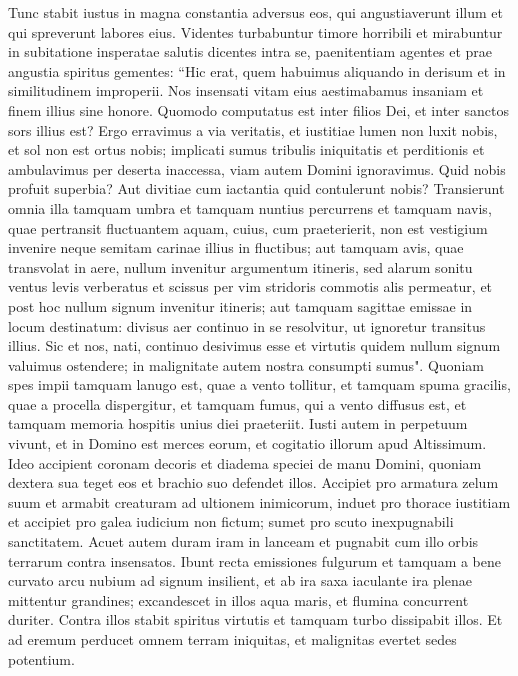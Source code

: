 \begin{biblechapter}  
\verse Tunc stabit iustus in magna constantia adversus eos, qui angustiaverunt illum et qui spreverunt labores eius. 
\verse Videntes turbabuntur timore horribili et mirabuntur in subitatione insperatae salutis 
\verse dicentes intra se, paenitentiam agentes et prae angustia spiritus gementes: 
\verse “Hic erat, quem habuimus aliquando in derisum et in similitudinem improperii. Nos insensati vitam eius aestimabamus insaniam et finem illius sine honore. 
\verse Quomodo computatus est inter filios Dei, et inter sanctos sors illius est? 
\verse Ergo erravimus a via veritatis, et iustitiae lumen non luxit nobis, et sol non est ortus nobis; 
\verse implicati sumus tribulis iniquitatis et perditionis et ambulavimus per deserta inaccessa, viam autem Domini ignoravimus. 
\verse Quid nobis profuit superbia? Aut divitiae cum iactantia quid contulerunt nobis? 
\verse Transierunt omnia illa tamquam umbra et tamquam nuntius percurrens 
\verse et tamquam navis, quae pertransit fluctuantem aquam, cuius, cum praeterierit, non est vestigium invenire neque semitam carinae illius in fluctibus; 
\verse aut tamquam avis, quae transvolat in aere, nullum invenitur argumentum itineris, sed alarum sonitu ventus levis verberatus et scissus per vim stridoris commotis alis permeatur, et post hoc nullum signum invenitur itineris; 
\verse aut tamquam sagittae emissae in locum destinatum: divisus aer continuo in se resolvitur, ut ignoretur transitus illius. 
\verse Sic et nos, nati, continuo desivimus esse et virtutis quidem nullum signum valuimus ostendere; in malignitate autem nostra consumpti sumus". 
\verse Quoniam spes impii tamquam lanugo est, quae a vento tollitur, et tamquam spuma gracilis, quae a procella dispergitur, et tamquam fumus, qui a vento diffusus est, et tamquam memoria hospitis unius diei praeteriit. 
\verse Iusti autem in perpetuum vivunt, et in Domino est merces eorum, et cogitatio illorum apud Altissimum. 
\verse Ideo accipient coronam decoris et diadema speciei de manu Domini, quoniam dextera sua teget eos et brachio suo defendet illos. 
\verse Accipiet pro armatura zelum suum et armabit creaturam ad ultionem inimicorum, 
\verse induet pro thorace iustitiam et accipiet pro galea iudicium non fictum; 
\verse sumet pro scuto inexpugnabili sanctitatem. 
\verse Acuet autem duram iram in lanceam et pugnabit cum illo orbis terrarum contra insensatos. 
\verse Ibunt recta emissiones fulgurum et tamquam a bene curvato arcu nubium ad signum insilient, 
\verse et ab ira saxa iaculante ira plenae mittentur grandines; excandescet in illos aqua maris, et flumina concurrent duriter. 
\verse Contra illos stabit spiritus virtutis et tamquam turbo dissipabit illos. Et ad eremum perducet omnem terram iniquitas, et malignitas evertet sedes potentium. 
\end{biblechapter}

